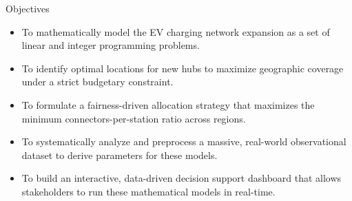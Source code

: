 \documentclass[aspectratio=169,10pt]{beamer}
\begin{document}
\begin{frame}{Objectives}

\vspace{0.35cm}

\begin{itemize}

    \item To mathematically model the EV charging network expansion as a set of linear and integer programming problems.

    \vspace{0.3cm}

    \item To identify optimal locations for new hubs to maximize geographic coverage under a strict budgetary constraint.

    \vspace{0.3cm}

    \item To formulate a fairness-driven allocation strategy that maximizes the minimum connectors-per-station ratio across regions.

    \vspace{0.3cm}

    \item To systematically analyze and preprocess a massive, real-world observational dataset to derive parameters for these models.

    \vspace{0.3cm}

    \item To build an interactive, data-driven decision support dashboard that allows stakeholders to run these mathematical models in real-time.

\end{itemize}

\end{frame}
\end{document}
